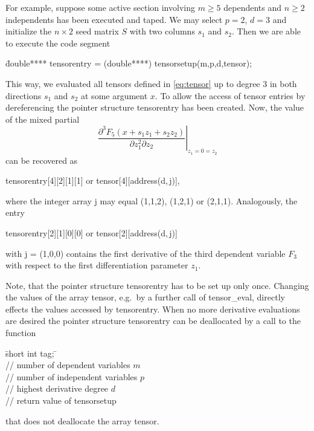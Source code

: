 \documentclass[11pt,twoside]{article}
\begin{document}
For example, suppose some active section involving  $m \geq 5$ dependents and 
$n \geq 2$ independents has been executed and taped. We may 
select $p=2$, $d=3$ and initialize the $n\times 2$ seed matrix $S$ with two 
columns $s_1$ and $s_2$. Then we are able to execute the code segment 
\begin{tabbing}
\hspace{0.5in}\={\sf double**** tensorentry = (double****) tensorsetup(m,p,d,tensor);} \\
\end{tabbing}
This way, we evaluated all tensors defined in \eqref{eq:tensor} up to degree 3
in both directions $s_1$ and 
$s_2$ at some argument $x$. To allow the access of tensor entries by dereferencing the pointer 
structure {\sf tensorentry} has been created. Now,  
the value of the mixed partial
\[
 \left. \frac{\partial ^ 3 F_5(x+s_1 z_1+s_2 z_2)}{\partial z_1^2 \partial z_2}   \right |_{z_1=0=z_2}  
\]
can be recovered as 
\begin{center}
   {\sf tensorentry[4][2][1][1]} \hspace{0.2in} or \hspace{0.2in} {\sf tensor[4][address(d,$\,$j)]},
\end{center}
where the integer array {\sf j} may equal (1,1,2), (1,2,1) or (2,1,1).  
Analogously, the entry 
\begin{center}   
   {\sf tensorentry[2][1][0][0]} \hspace{0.2in} or \hspace{0.2in} {\sf tensor[2][address(d,$\,$j)]}
\end{center}
with {\sf j} = (1,0,0) contains the first derivative of the third dependent
variable $F_3$ with respect to the first differentiation parameter $z_1$. 

Note, that the pointer structure {\sf tensorentry} has to be set up only once. Changing the values of the
array {\sf tensor}, e.g.~by a further call of {\sf tensor\_eval}, directly effects the values accessed
by {\sf tensorentry}.
%
When no more derivative evaluations are desired the pointer structure
{\sf tensorentry} can be deallocated by a call to the function
%
\begin{tabbing}
\hspace{0.5in}\={\sf short int tag;} \hspace{1.1in}\= \kill    %
\\
                    \> // number of dependent variables $m$ \\
                    \> // number of independent variables $p$\\
                    \> // highest derivative degree $d$\\
 \> // return value of {\sf tensorsetup}  
\end{tabbing} 
%
that does not deallocate the array {\sf tensor}.
\end{document}
